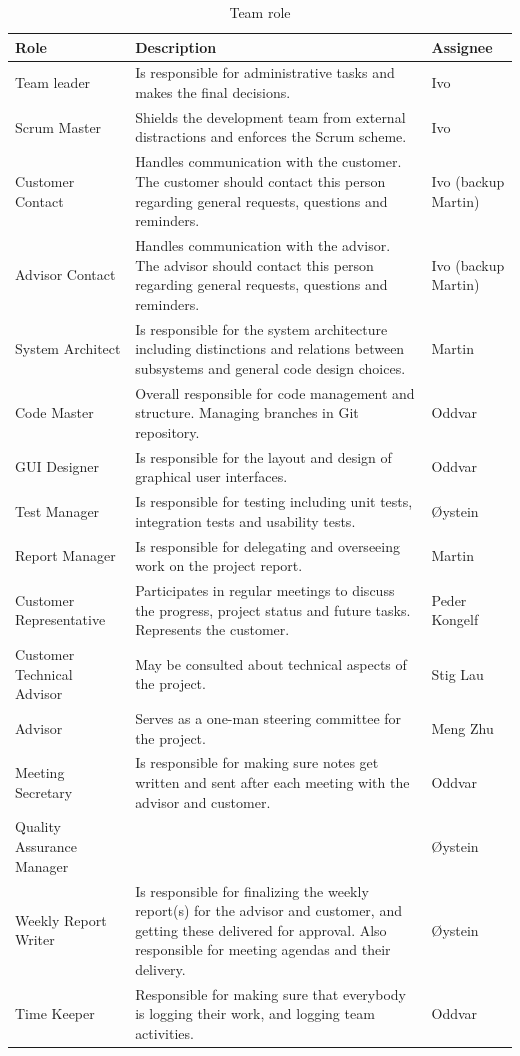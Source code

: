 \begin{table}
\begin{tabularx}{\textwidth}{ | l | X | l | }
  \hline
  \textbf{Role} & \textbf{Description} & \textbf{Assignee} \\ 
  \hline
  Team leader & Is responsible for administrative tasks and makes the final decisions. & Ivo \\ 
  \hline
  Scrum Master & Shields the development team from external distractions and enforces the Scrum scheme.  & Ivo \\ 
  \hline
  Customer Contact & Handles communication with the customer. The customer should contact this person regarding general requests, questions and reminders. & Ivo (backup Martin) \\ 
  \hline
  Advisor Contact & Handles communication with the advisor. The advisor should contact this person regarding general requests, questions and reminders.  & Ivo (backup Martin) \\ 
  \hline
  System Architect & Is responsible for the system architecture including distinctions and relations between subsystems and general code design choices. & Martin \\ 
  \hline
  Code Master & Overall responsible for code management and structure. Managing branches in Git repository. & Oddvar  \\ 
  \hline
  GUI Designer & Is responsible for the layout and design of graphical user interfaces. & Oddvar \\ 
  \hline
  Test Manager & Is responsible for testing including unit tests, integration tests and usability tests. & Øystein \\ 
  \hline
  Report Manager & Is responsible for delegating and overseeing work on the project report. & Martin \\ 
  \hline
  Customer Representative & Participates in regular meetings to discuss the progress, project status and future tasks. Represents the customer. & Peder Kongelf \\ 
  \hline
  Customer Technical Advisor & May be consulted about technical aspects of the project. & Stig Lau \\ 
  \hline
  Advisor & Serves as a one-man steering committee for the project. & Meng Zhu \\ 
  \hline
  Meeting Secretary & Is responsible for making sure notes get written and sent after each meeting with the advisor and customer. & Oddvar \\ 
  \hline
  Quality Assurance Manager &  & Øystein \\ 
  \hline
  Weekly Report Writer & Is responsible for finalizing the weekly report(s) for the advisor and customer, and getting these delivered for approval. Also responsible for meeting agendas and their delivery. & Øystein \\ 
  \hline
  Time Keeper & Responsible for making sure that everybody is logging their work, and logging team activities. & Oddvar \\ 
  \hline
\end{tabularx}
\caption{Team role}
\end{table}

